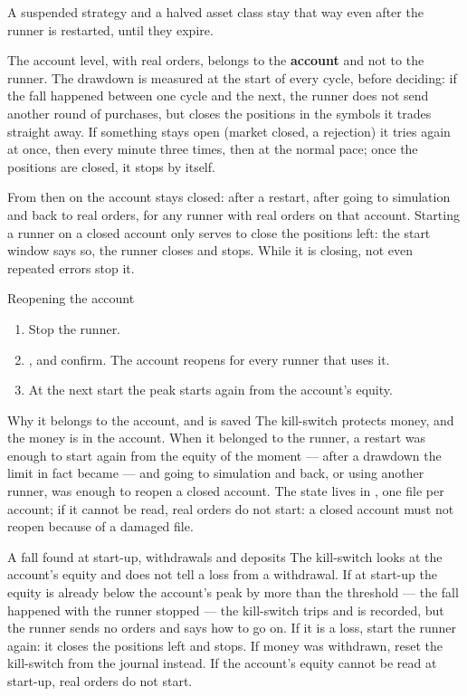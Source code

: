 \noindent
A suspended strategy and a halved asset class stay that way even after the
runner is restarted, until they expire.

The account level, with real orders, belongs to the \textbf{account} and not
to the runner. The drawdown is measured at the start of every cycle, before
deciding: if the fall happened between one cycle and the next, the runner
does not send another round of purchases, but closes the positions in the
symbols it trades straight away. If something stays open (market closed, a
rejection) it tries again at once, then every minute three times, then at
the normal pace; once the positions are closed, it stops by itself.

\noindent
From then on the account stays closed: after a restart, after going to
simulation and back to real orders, for any runner with real orders on that
account. Starting a runner on a closed account only serves to close the
positions left: the start window says so, the runner closes and stops. While
it is closing, not even repeated errors stop it.

\begin{pratica}{Reopening the account}
\begin{enumerate}
  \item Stop the runner.
  \item {} \freccia {}, and confirm.
        The account reopens for every runner that uses it.
  \item At the next start the peak starts again from the account's equity.
\end{enumerate}
\end{pratica}

\begin{perche}{Why it belongs to the account, and is saved}
The kill-switch protects money, and the money is in the account. When it
belonged to the runner, a restart was enough to start again from the equity
of the moment --- after a  drawdown the  limit in fact
became  --- and going to simulation and back, or using another
runner, was enough to reopen a closed account. The state lives in
, one file per account; if it cannot be read, real
orders do not start: a closed account must not reopen because of a damaged
file.
\end{perche}

\begin{nota}{A fall found at start-up, withdrawals and deposits}
The kill-switch looks at the account's equity and does not tell a loss from
a withdrawal. If at start-up the equity is already below the account's peak
by more than the threshold --- the fall happened with the runner stopped ---
the kill-switch trips and is recorded, but the runner sends no orders and
says how to go on. If it is a loss, start the runner again: it closes the
positions left and stops. If money was withdrawn, reset the kill-switch from
the journal instead. If the account's equity cannot be read at start-up,
real orders do not start.
\end{nota}

